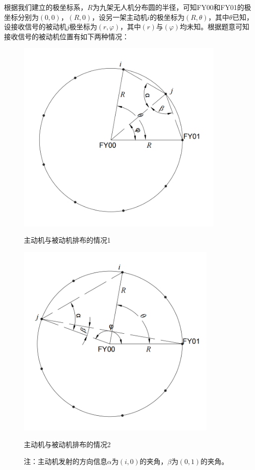 \documentclass[withoutpreface,bwprint]{cumcmthesis} %
\begin{document}
根据我们建立的极坐标系，$R$为九架无人机分布圆的半径，可知FY00和FY01的极坐标分别为$(0,0)$，$(R,0)$，设另一架主动机$i$的极坐标为$(R,\theta)$，其中$\theta$已知，设接收信号的被动机$j$极坐标为$(r,\varphi)$，其中$(r)$与$(\varphi)$均未知。根据题意可知接收信号的被动机位置有如下两种情况：
\begin{figure}[H]
    \centering
    \begin{minipage}{0.49\textwidth}
        \centering
        \includegraphics[width=0.9\textwidth]{../figure/q1_1.png} 
        \caption{主动机与被动机排布的情况1}
        \label{q1_1}
    \end{minipage}
    \begin{minipage}{0.49\textwidth}
        \centering
        \includegraphics[width=0.868\textwidth]{../figure/q1_2.png} 
        \caption{主动机与被动机排布的情况2}
        \label{q1_2}   
    \end{minipage}
    \caption*{\small 注：主动机发射的方向信息$\alpha$为$(i,0)$的夹角，$\beta$为$(0,1)$的夹角。}
\end{figure}
\end{document}
